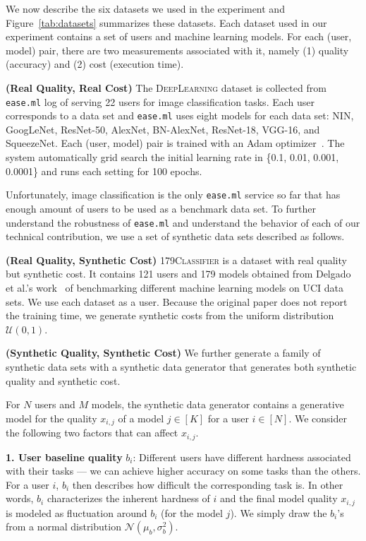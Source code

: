 \documentclass[letterpaper]{vldb}
\newcommand{\eml}{\texttt{ease.ml}\xspace}
\begin{document}
We now describe the six datasets we used
in the experiment and Figure~\ref{tab:datasets} summarizes these datasets.
Each dataset used in our experiment 
contains a set of users and machine
learning models. For each (user, model)
pair, there are two measurements
associated with it, namely (1) quality
(accuracy) and (2) cost
(execution time).

\vspace{0.5em}
\noindent
{\bf (Real Quality, Real Cost)} The 
\textsc{DeepLearning} dataset is collected
from \eml log of serving 22 users 
for image classification tasks. Each
user corresponds to a data set and
\eml uses eight models for
each data set:
NIN, GoogLeNet, ResNet-50, AlexNet, BN-AlexNet, ResNet-18, VGG-16, and SqueezeNet.
Each (user, model) pair is trained with
an Adam optimizer~\cite{XX}. The
system automatically grid search 
the initial learning rate in
\{0.1, 0.01, 0.001, 0.0001\} and
runs each setting for 100 epochs.

\vspace{0.5em}
Unfortunately, image classification 
is the only \eml service so far that
has enough amount of users
to be used as a benchmark data set.
To further understand the robustness
of \eml and understand the
behavior of each of our technical
contribution, we use a set
of synthetic data sets described
as follows.

\vspace{0.5em}
\noindent
{\bf (Real Quality, Synthetic Cost)} 
\textsc{179Classifier}
is a dataset with real quality 
but synthetic cost. It contains
121 users and 179 models obtained from
Delgado et al.'s work~\cite{DelgadoCBA14}
of benchmarking different machine
learning models on UCI data sets.
We use each dataset as a user.
Because the original paper does not
report the training time, we 
generate synthetic costs from the uniform distribution $\mathcal{U}(0, 1)$.

\vspace{0.5em}
\noindent
{\bf (Synthetic Quality, Synthetic Cost)}
We further generate a family of 
synthetic data sets with a 
synthetic data generator that generates
both synthetic quality and synthetic cost.

For $N$ users and $M$ models, the synthetic
data generator contains a generative model 
for the quality $x_{i,j}$ of a 
model $j\in[K]$ for a user $i\in[N]$.
We consider the following two factors that can affect $x_{i,j}$.

\noindent
{\bf 1. User baseline quality} $b_i$: Different 
users have different hardness associated with their tasks --- we can achieve higher accuracy on some tasks than the others.
For a user $i$, $b_i$ then describes how difficult the corresponding task is.
In other words, $b_i$ characterizes the inherent hardness of $i$ and the final model quality $x_{i,j}$ is modeled as fluctuation around $b_i$ (for the model $j$). We simply draw the $b_i$'s from a normal distribution $\mathcal{N}(\mu_b,\sigma_b^2)$.
\end{document}
